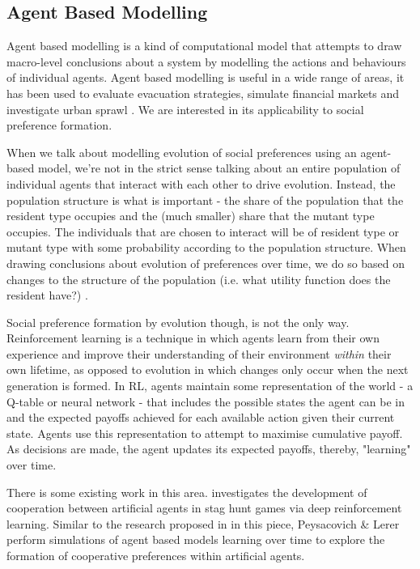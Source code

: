 \documentclass[11pt]{article}
\newcommand*{\np}{\par\noindent\newline}
\begin{document}
\subsection{Agent Based Modelling}\label{abm}
Agent based modelling is a kind of computational model that attempts to draw
macro-level conclusions about a system by modelling the actions and behaviours
of individual agents. Agent based modelling is useful in a wide range of areas,
it has been used to evaluate evacuation strategies\cite{taylor_agent-based_2014},
simulate financial markets \cite{deissenberg_eurace:_2008} and investigate
urban sprawl \cite{brown_effects_2006}. We are interested in its applicability
to social preference formation.

\np When we talk about modelling evolution of social preferences using an
agent-based model, we're not in the strict sense talking about an entire
population of individual agents that interact with each other to drive
evolution. Instead, the population structure is what is important - the share
of the population that the resident type occupies and the (much smaller) share
that the mutant type occupies. The individuals that are chosen to interact will
be of resident type or mutant type with some probability according to the
population structure. When drawing conclusions about evolution of preferences
over time, we do so based on changes to the structure of the population (i.e.
what utility function does the resident have?) \cite{shoham_multiagent_nodate}.

\np Social preference formation by evolution though, is not the only way.
Reinforcement learning is a technique in which agents learn from their own
experience and improve their understanding of their environment \textit{within}
their own lifetime, as opposed to evolution in which changes only occur when
the next generation is formed. In RL, agents maintain some representation of
the world - a Q-table or neural network - that includes the possible states the
agent can be in and the expected payoffs achieved for each available action
given their current state. Agents use this representation to attempt to
maximise cumulative payoff. As decisions are made, the agent updates its expected payoffs, thereby, "learning" over time.

\np There is some existing work in this area. \cite{peysakhovich_prosocial_2017}
investigates the development of cooperation between artificial agents in stag
hunt games via deep reinforcement learning. Similar to the research proposed in
in this piece, Peysacovich \& Lerer perform simulations of agent based models
learning over time to explore the formation of cooperative preferences within
artificial agents.
\end{document}
